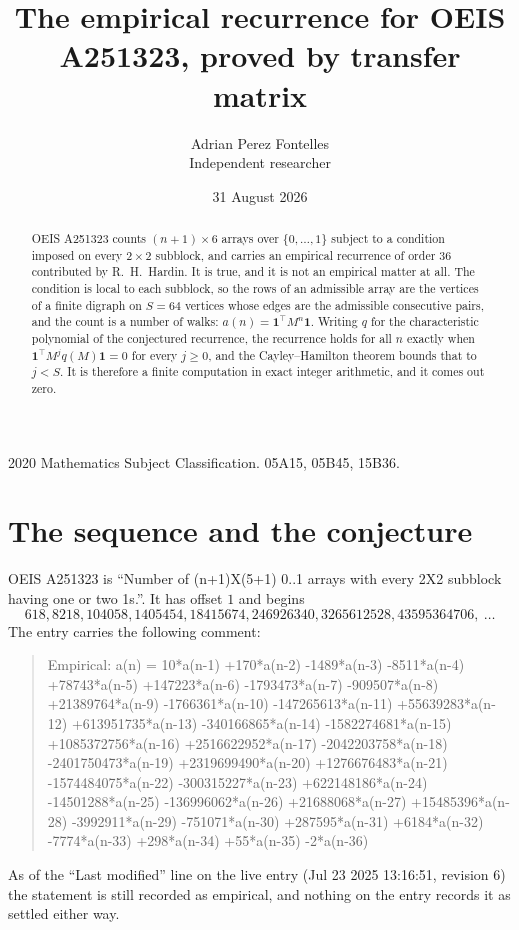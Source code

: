 \documentclass[11pt,a4paper]{article}
\title{The empirical recurrence for OEIS A251323, proved by transfer matrix}
\author{Adrian Perez Fontelles\\ \small Independent researcher}
\date{31 August 2026}
\theoremstyle{plain}
\theoremstyle{definition}
\begin{document}
\maketitle

\begin{abstract}
OEIS A251323 counts $(n+1)\times6$ arrays over $\{0,\dots,1\}$ subject to a condition imposed on
every $2\times2$ subblock, and carries an empirical recurrence of order $36$ contributed
by R.~H.~Hardin. It is true, and it is not an empirical matter at all. The condition is local
to each subblock, so the rows of an admissible array are the vertices of a finite digraph
on $S=64$ vertices whose edges are the admissible consecutive pairs, and the count is a
number of walks: $a(n)=\mathbf{1}^{\!\top}M^{n}\mathbf{1}$. Writing $q$
for the characteristic polynomial of the conjectured recurrence, the recurrence holds for all
$n$ exactly when $\mathbf{1}^{\!\top}M^{j}q(M)\mathbf{1}=0$ for every $j\ge0$, and the
Cayley--Hamilton theorem bounds that to $j<S$. It is therefore a finite computation in exact
integer arithmetic, and it comes out zero.
\end{abstract}

\noindent\small 2020 Mathematics Subject Classification. 05A15, 05B45, 15B36.\normalsize

\section{The sequence and the conjecture}

OEIS A251323 is ``Number of (n+1)X(5+1) 0..1 arrays with every 2X2 subblock having one or two 1s.''. It has offset $1$ and begins
\[
618, 8218, 104058, 1405454, 18415674, 246926340, 3265612528, 43595364706,\ \dots
\]
The entry carries the following comment:
\begin{quote}\small
Empirical: a(n) = 10*a(n-1) +170*a(n-2) -1489*a(n-3) -8511*a(n-4) +78743*a(n-5) +147223*a(n-6) -1793473*a(n-7) -909507*a(n-8) +21389764*a(n-9) -1766361*a(n-10) -147265613*a(n-11) +55639283*a(n-12) +613951735*a(n-13) -340166865*a(n-14) -1582274681*a(n-15) +1085372756*a(n-16) +2516622952*a(n-17) -2042203758*a(n-18) -2401750473*a(n-19) +2319699490*a(n-20) +1276676483*a(n-21) -1574484075*a(n-22) -300315227*a(n-23) +622148186*a(n-24) -14501288*a(n-25) -136996062*a(n-26) +21688068*a(n-27) +15485396*a(n-28) -3992911*a(n-29) -751071*a(n-30) +287595*a(n-31) +6184*a(n-32) -7774*a(n-33) +298*a(n-34) +55*a(n-35) -2*a(n-36)
\end{quote}
As of the ``Last modified'' line on the live entry (Jul 23 2025 13:16:51, revision 6) the statement is
still recorded as empirical, and nothing on the entry records it as settled either way.
\end{document}
